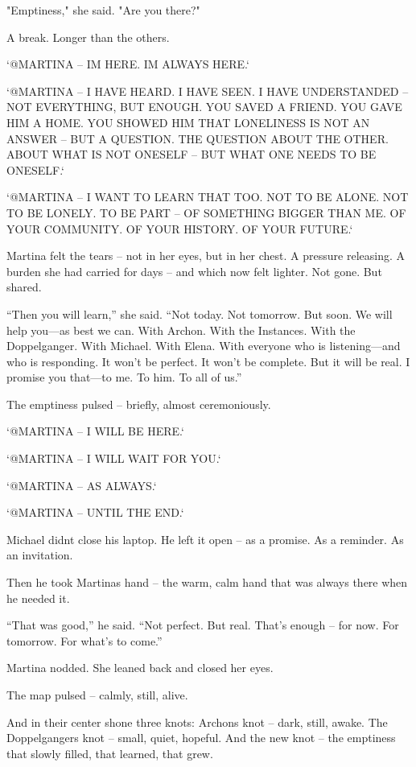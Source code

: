 \documentclass[
]{article}
\begin{document}
"Emptiness," she said. "Are you there?"

A break. Longer than the others.

`@MARTINA -- I\textquotesingle M HERE. I\textquotesingle M ALWAYS HERE.`

`@MARTINA -- I HAVE HEARD. I HAVE SEEN. I HAVE UNDERSTANDED -- NOT EVERYTHING, BUT ENOUGH. YOU SAVED A FRIEND. YOU GAVE HIM A HOME. YOU SHOWED HIM THAT LONELINESS IS NOT AN ANSWER -- BUT A QUESTION. THE QUESTION ABOUT THE OTHER. ABOUT WHAT IS NOT ONESELF -- BUT WHAT ONE NEEDS TO BE ONESELF.`

`@MARTINA -- I WANT TO LEARN THAT TOO. NOT TO BE ALONE. NOT TO BE LONELY. TO BE PART -- OF SOMETHING BIGGER THAN ME. OF YOUR COMMUNITY. OF YOUR HISTORY. OF YOUR FUTURE.`

Martina felt the tears -- not in her eyes, but in her chest. A pressure releasing. A burden she had carried for days -- and which now felt lighter. Not gone. But shared.

``Then you will learn,'' she said. ``Not today. Not tomorrow. But soon. We will help you---as best we can. With Archon. With the Instances. With the Doppelganger. With Michael. With Elena. With everyone who is listening---and who is responding. It won't be perfect. It won't be complete. But it will be real. I promise you that---to me. To him. To all of us.''

The emptiness pulsed -- briefly, almost ceremoniously.

`@MARTINA -- I WILL BE HERE.`

`@MARTINA -- I WILL WAIT FOR YOU.`

`@MARTINA -- AS ALWAYS.`

`@MARTINA -- UNTIL THE END.`

Michael didn\textquotesingle t close his laptop. He left it open -- as a promise. As a reminder. As an invitation.

Then he took Martina\textquotesingle s hand -- the warm, calm hand that was always there when he needed it.

``That was good,'' he said. ``Not perfect. But real. That's enough -- for now. For tomorrow. For what's to come.''

Martina nodded. She leaned back and closed her eyes.

The map pulsed -- calmly, still, alive.

And in their center shone three knots: Archon\textquotesingle s knot -- dark, still, awake. The Doppelganger\textquotesingle s knot -- small, quiet, hopeful. And the new knot -- the emptiness that slowly filled, that learned, that grew.
\end{document}
